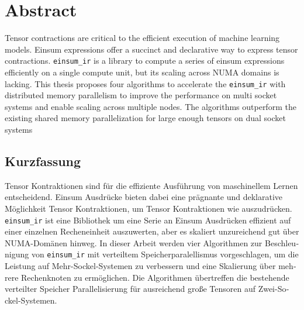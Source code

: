 \thispagestyle{empty} 

\section*{Abstract}

Tensor contractions are critical to the efficient execution of machine learning models.
Einsum expressions offer a succinct and declarative way to express tensor contractions.
\texttt{einsum\_ir}  is a library to compute a series of einsum expressions  efficiently on a single compute unit, but its scaling across NUMA domains is lacking.
This thesis proposes four algorithms to accelerate the \texttt{einsum\_ir} with distributed memory parallelism to improve the performance on multi socket systems and enable scaling across multiple nodes.
The algorithms outperform the existing shared memory parallelization for large enough tensors on dual socket systems

\thispagestyle{empty} 

\begin{otherlanguage}{ngerman}
\section*{Kurzfassung}

Tensor Kontraktionen sind für die effiziente Ausführung von maschinellem Lernen entscheidend.
Einsum Ausdrücke bieten dabei eine prägnante und deklarative Möglichkeit Tensor Kontraktionen, um Tensor Kontraktionen wie auszudrücken.
\texttt{einsum\_ir} ist eine Bibliothek um eine Serie an Einsum Ausdrücken effizient auf einer einzelnen Recheneinheit auszuwerten, aber es skaliert unzureichend gut über NUMA-Domänen hinweg.
In dieser Arbeit werden vier Algorithmen zur Beschleunigung von \texttt{einsum\_ir} mit verteiltem Speicherparalellismus vorgeschlagen, um die Leistung auf Mehr-Sockel-Systemen zu verbessern und eine Skalierung über mehrere Rechenknoten zu ermöglichen.
Die Algorithmen übertreffen die bestehende verteilter Speicher Parallelisierung für ausreichend große Tensoren auf Zwei-Sockel-Systemen.
\end{otherlanguage}
